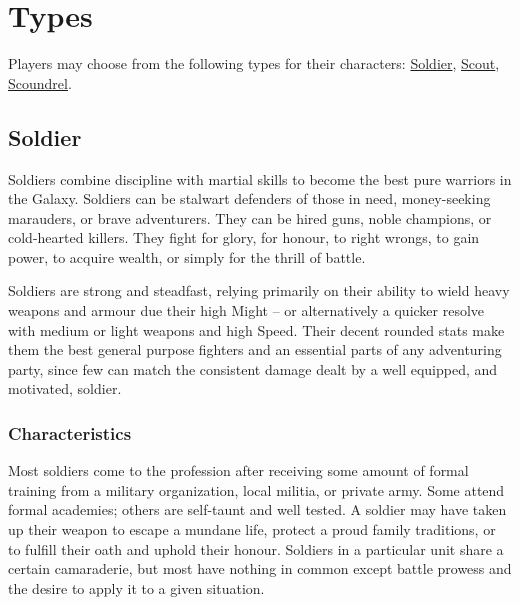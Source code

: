\documentclass[a4paper,10pt,final,twocolumn,oneside]{book}
\begin{document}

\clearpage


\section{Types} %
\label{sec:types}

Players may choose from the following types for their characters: \hyperlink{sub:soldier}{Soldier}, \hyperlink{sub:scout}{Scout}, \hyperlink{sub:scoundrel}{Scoundrel}.

\subsection{Soldier} %
\label{sub:soldier}

Soldiers combine discipline with martial skills to become the best pure warriors in the Galaxy. Soldiers can be stalwart defenders of those in need, money-seeking marauders, or brave adventurers. They can be hired guns, noble champions, or cold-hearted killers. They fight for glory, for honour, to right wrongs, to gain power, to acquire wealth,  or simply for the thrill of battle.

Soldiers are strong and steadfast, relying primarily on their ability to wield heavy weapons and armour due their high Might -- or alternatively a quicker resolve with medium or light weapons and high Speed. Their decent rounded stats make them the best general purpose fighters and an essential parts of any adventuring party, since few can match the consistent damage dealt by a well equipped, and motivated, soldier.

\subsubsection*{Characteristics}
\label{subsub:soldierCharacteristics}

Most soldiers come to the profession after receiving some amount of formal training from a military organization, local militia, or private army. Some attend formal academies; others are self-taunt and well tested. A soldier may have taken up their weapon to escape a mundane life, protect a proud family traditions, or to fulfill their oath and uphold their honour. Soldiers in a particular unit share a certain camaraderie, but most have nothing in common except battle prowess and the desire to apply it to a given situation.
\end{document}
